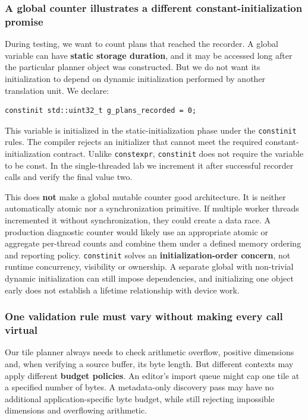 \subsubsection{A global counter illustrates a different constant-initialization promise}\label{a-global-counter-illustrates-a-different-constant-initialization-promise}

During testing, we want to count plans that reached the recorder. A global variable can have \textbf{static storage duration}, and it may be accessed long after the particular planner object was constructed. But we do not want its initialization to depend on dynamic initialization performed by another translation unit. We declare:

\begin{verbatim}
constinit std::uint32_t g_plans_recorded = 0;
\end{verbatim}

This variable is initialized in the static-initialization phase under the \texttt{constinit} rules. The compiler rejects an initializer that cannot meet the required constant-initialization contract. Unlike \texttt{constexpr}, \texttt{constinit} does not require the variable to be const. In the single-threaded lab we increment it after successful recorder calls and verify the final value two.

This does \textbf{not} make a global mutable counter good architecture. It is neither automatically atomic nor a synchronization primitive. If multiple worker threads incremented it without synchronization, they could create a data race. A production diagnostic counter would likely use an appropriate atomic or aggregate per-thread counts and combine them under a defined memory ordering and reporting policy. \texttt{constinit} solves an \textbf{initialization-order concern}, not runtime concurrency, visibility or ownership. A separate global with non-trivial dynamic initialization can still impose dependencies, and initializing one object early does not establish a lifetime relationship with device work.

\subsubsection{One validation rule must vary without making every call virtual}\label{one-validation-rule-must-vary-without-making-every-call-virtual}

Our tile planner always needs to check arithmetic overflow, positive dimensions and, when verifying a source buffer, its byte length. But different contexts may apply different \textbf{budget policies}. An editor's import queue might cap one tile at a specified number of bytes. A metadata-only discovery pass may have no additional application-specific byte budget, while still rejecting impossible dimensions and overflowing arithmetic.

